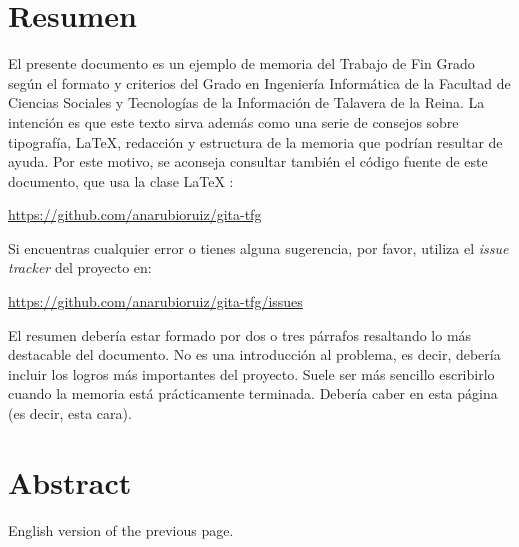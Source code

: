 \chapter{Resumen}

El presente documento es un ejemplo de memoria del Trabajo de Fin Grado según el formato y criterios del Grado en Ingeniería Informática de la Facultad de Ciencias Sociales y Tecnologías de la Información de Talavera de la Reina. La intención es que este texto sirva además como una serie de consejos sobre tipografía, \LaTeX, redacción y estructura de la memoria que podrían resultar de ayuda. Por este motivo, se aconseja consultar también el código fuente de este documento, que usa la clase \LaTeX{} \gitatfg{}:

 \url{https://github.com/anarubioruiz/gita-tfg}

Si encuentras cualquier error o tienes alguna sugerencia, por favor, utiliza el \emph{issue tracker} del proyecto \gitatfg{} en:

\url{https://github.com/anarubioruiz/gita-tfg/issues}

El resumen debería estar formado por dos o tres párrafos resaltando lo más destacable del documento. No es una introducción al problema, es decir, debería incluir los logros más importantes del proyecto. Suele ser más sencillo escribirlo cuando la memoria está prácticamente terminada. Debería caber en esta página (es decir, esta cara).


\chapter{Abstract}

English version of the previous page.
